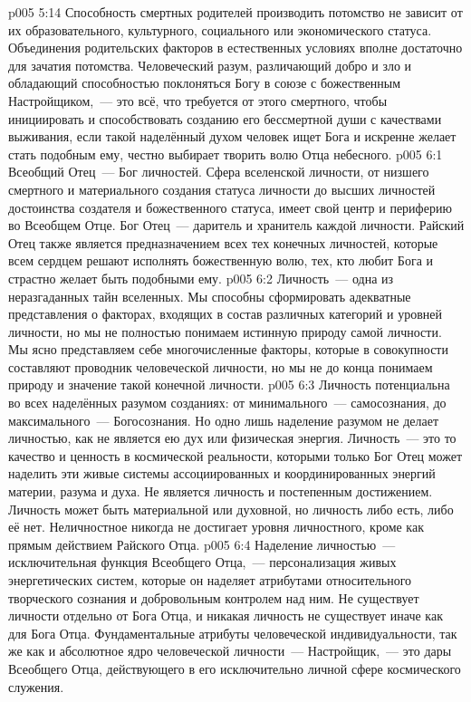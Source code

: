 \vs p005 5:14 Способность смертных родителей производить потомство не зависит от их образовательного, культурного, социального или экономического статуса. Объединения родительских факторов в естественных условиях вполне достаточно для зачатия потомства. Человеческий разум, различающий добро и зло и обладающий способностью поклоняться Богу в союзе с божественным Настройщиком,~--- это всё, что требуется от этого смертного, чтобы инициировать и способствовать созданию его бессмертной души с качествами выживания, если такой наделённый духом человек ищет Бога и искренне желает стать подобным ему, честно выбирает творить волю Отца небесного.
\vs p005 6:1 Всеобщий Отец~--- Бог личностей. Сфера вселенской личности, от низшего смертного и материального создания статуса личности до высших личностей достоинства создателя и божественного статуса, имеет свой центр и периферию во Всеобщем Отце. Бог Отец~--- даритель и хранитель каждой личности. Райский Отец также является предназначением всех тех конечных личностей, которые всем сердцем решают исполнять божественную волю, тех, кто любит Бога и страстно желает быть подобными ему.
\vs p005 6:2 \pc Личность~--- одна из неразгаданных тайн вселенных. Мы способны сформировать адекватные представления о факторах, входящих в состав различных категорий и уровней личности, но мы не полностью понимаем истинную природу самой личности. Мы ясно представляем себе многочисленные факторы, которые в совокупности составляют проводник человеческой личности, но мы не до конца понимаем природу и значение такой конечной личности.
\vs p005 6:3 Личность потенциальна во всех наделённых разумом созданиях: от минимального~--- самосознания, до максимального~--- Богосознания. Но одно лишь наделение разумом не делает личностью, как не является ею дух или физическая энергия. Личность~--- это то качество и ценность в космической реальности, которыми только Бог Отец может наделить эти живые системы ассоциированных и координированных энергий материи, разума и духа. Не является личность и постепенным достижением. Личность может быть материальной или духовной, но личность либо есть, либо её нет. Неличностное никогда не достигает уровня личностного, кроме как прямым действием Райского Отца.
\vs p005 6:4 Наделение личностью~--- исключительная функция Всеобщего Отца,~--- персонализация живых энергетических систем, которые он наделяет атрибутами относительного творческого сознания и добровольным контролем над ним. Не существует личности отдельно от Бога Отца, и никакая личность не существует иначе как для Бога Отца. Фундаментальные атрибуты человеческой индивидуальности, так же как и абсолютное ядро человеческой личности~--- Настройщик,~--- это дары Всеобщего Отца, действующего в его исключительно личной сфере космического служения.

